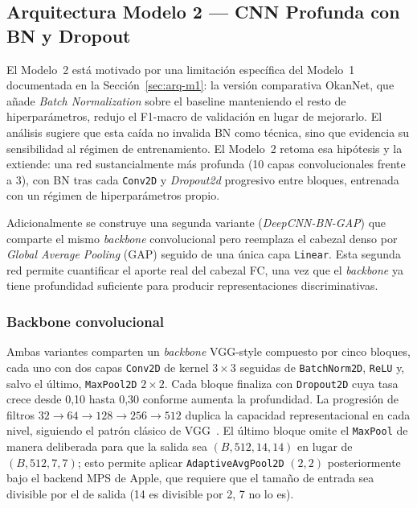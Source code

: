 \subsection{Arquitectura Modelo 2 --- CNN Profunda con BN y Dropout}
\label{sec:arq-m2}

El Modelo~2 está motivado por una limitación específica del
Modelo~1 documentada en la Sección~\ref{sec:arq-m1}: la
versión comparativa OkanNet, que añade
\textit{Batch Normalization} sobre el baseline manteniendo el
resto de hiperparámetros, redujo el F1-macro de validación
en lugar de mejorarlo. El análisis sugiere que esta caída no
invalida BN como técnica, sino que evidencia su sensibilidad
al régimen de entrenamiento. El Modelo~2 retoma esa hipótesis
y la extiende: una red sustancialmente más profunda (10 capas
convolucionales frente a 3), con BN tras cada \texttt{Conv2D}
y \textit{Dropout2d} progresivo entre bloques, entrenada con
un régimen de hiperparámetros propio.

Adicionalmente se construye una segunda variante
(\textit{DeepCNN-BN-GAP}) que comparte el mismo \textit{backbone}
convolucional pero reemplaza el cabezal denso por
\textit{Global Average Pooling} (GAP) seguido de una única capa
\texttt{Linear}. Esta segunda red permite cuantificar el aporte
real del cabezal FC, una vez que el \textit{backbone} ya tiene
profundidad suficiente para producir representaciones
discriminativas.

\subsubsection*{Backbone convolucional}

Ambas variantes comparten un \textit{backbone} VGG-style
compuesto por cinco bloques, cada uno con dos capas
\texttt{Conv2D} de kernel $3{\times}3$ seguidas de
\texttt{BatchNorm2D}, \texttt{ReLU} y, salvo el último,
\texttt{MaxPool2D} $2{\times}2$. Cada bloque finaliza con
\texttt{Dropout2D} cuya tasa crece desde 0{,}10 hasta 0{,}30
conforme aumenta la profundidad. La progresión de filtros
$32{\to}64{\to}128{\to}256{\to}512$ duplica la capacidad
representacional en cada nivel, siguiendo el patrón clásico
de VGG~\cite{simonyan2014very}. El último bloque omite el
\texttt{MaxPool} de manera deliberada para que la salida sea
$(B, 512, 14, 14)$ en lugar de $(B, 512, 7, 7)$; esto permite
aplicar \texttt{AdaptiveAvgPool2D} $(2, 2)$ posteriormente
bajo el backend MPS de Apple, que requiere que el tamaño de
entrada sea divisible por el de salida (14 es divisible por
2, 7 no lo es).


